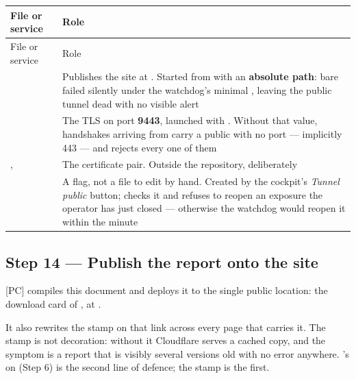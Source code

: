 \begin{longtable}{@{}L{5.3cm}L{8.3cm}@{}}
\toprule
File or service & Role \\
\midrule
\endfirsthead
\toprule
File or service & Role \\
\midrule
\endhead
{} &
  Publishes the site at . Started from
   with an \textbf{absolute path}: bare
   failed silently under the watchdog's minimal
  , leaving the public tunnel dead with no visible alert \\
\addlinespace
{} \newline {} &
  The TLS  on port \textbf{9443}, launched with
  . Without that value, handshakes
  arriving from  carry a public  with no port
  --- implicitly 443 --- and  rejects every one of them \\
\addlinespace
{}, \newline
{} &
  The certificate pair. Outside the repository, deliberately \\
\addlinespace
{} &
  A flag, not a file to edit by hand. Created by the cockpit's
  \emph{Tunnel public} button;  checks it and refuses to
  reopen an exposure the operator has just closed --- otherwise the watchdog
  would reopen it within the minute \\
\bottomrule
\end{longtable}

\subsection{Step 14 --- Publish the report onto the site}
\label{ap:repro-web-report}

 [PC] compiles this document and deploys it to
the single public location: the download card of
, at
 \newline {}\newline{}.

It also rewrites the  stamp on that link across every page that
carries it. The stamp is not decoration: without it Cloudflare serves a cached
copy, and the symptom is a report that is visibly several versions old with no
error anywhere. 's  on  (Step 6) is
the second line of defence; the stamp is the first.


